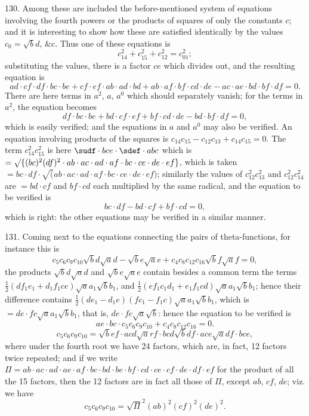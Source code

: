 \documentclass[12pt]{article}
\theoremstyle{plain}
\begin{document}
130. Among these are included the before-mentioned system of equations involving the fourth powers or the products of squares of only the constants $c$; and it is interesting to show how these are satisfied identically by the values $c_0 = \surd bd$, \&c. Thus one of these equations is
\[
c_{14}^2 + c_{15}^2 + c_{12}^2 = c_{01}^2;
\]
substituting the values, there is a factor $ce$ which divides out, and the resulting equation is
\[
ad \cdot cf \cdot df \cdot bc \cdot be + cf \cdot ef \cdot ab \cdot ad \cdot bd + ab \cdot af \cdot bf \cdot cd \cdot de - ac \cdot ae \cdot bd \cdot bf \cdot df = 0.
\]
There are here terms in $a^2$, $a$, $a^0$ which should separately vanish; for the terms in $a^2$, the equation becomes
\[
df \cdot bc \cdot be + bd \cdot cf \cdot ef + bf \cdot cd \cdot de - bd \cdot bf \cdot df = 0,
\]
which is easily verified; and the equations in $a$ and $a^0$ may also be verified. An equation involving products of the squares is $c_{14}c_{15} - c_{12}c_{13} + c_{14}c_{15} = 0$. The term $c_{14}^2 c_{15}^2$ is here $\sudf \cdot bce \cdot \sdef \cdot abc$ which is $= \surd\{(bc)^2 (df)^2 \cdot ab \cdot ac \cdot ad \cdot af \cdot bc \cdot ce \cdot de \cdot ef\}$, which is taken $= bc \cdot df \cdot \surd(ab \cdot ac \cdot ad \cdot af \cdot bc \cdot ce \cdot de \cdot ef)$; similarly the values of $c_{12}^2 c_{13}^2$ and $c_{12}^2 c_{14}^2$ are $= bd \cdot cf$ and $bf \cdot cd$ each multiplied by the same radical, and the equation to be verified is
\[
bc \cdot df - bd \cdot cf + bf \cdot cd = 0,
\]
which is right: the other equations may be verified in a similar manner.

131. Coming next to the equations connecting the pairs of theta-functions, for instance this is
\[
c_5 c_6 c_9 c_{10} \surd bd \surd ad - \surd be \surd ae + c_4 c_8 c_{12} c_{16} \surd bf \surd af = 0,
\]
the products $\surd bd \surd ad$ and $\surd be \surd ae$ contain besides a common term the terms $\tfrac12 (df_1 e_1 + d_1 f_1 ce) \surd aa_1 \surd bb_1$, and $\tfrac12 (ef_1 c_1 d_1 + e_1 f_1 cd) \surd aa_1 \surd bb_1$; hence their difference contains $\tfrac12 (de_1 - d_1 e)(fc_1 - f_1 c) \surd aa_1 \surd bb_1$, which is $= de \cdot fc \surd aa_1 \surd bb_1$, that is, $de \cdot fc \surd a \surd b$: hence the equation to be verified is
\[
ae \cdot bc \cdot c_5 c_6 c_9 c_{10} + c_4 c_8 c_{12} c_{16} = 0.
\]
\[
c_5 c_6 c_9 c_{10} = \surd bef \cdot acd \surd arf \cdot bcd \surd bdf \cdot ace \surd adf \cdot bce,
\]
where under the fourth root we have 24 factors, which are, in fact, 12 factors twice repeated; and if we write $\Pi = ab \cdot ac \cdot ad \cdot ae \cdot af \cdot bc \cdot bd \cdot be \cdot bf \cdot cd \cdot ce \cdot cf \cdot de \cdot df \cdot ef$ for the product of all the 15 factors, then the 12 factors are in fact all those of $\Pi$, except $ab$, $cf$, $de$; viz. we have
\[
c_5 c_6 c_9 c_{10} = \surd\Pi^2 (ab)^2 (cf)^2 (de)^2.
\]
\end{document}

